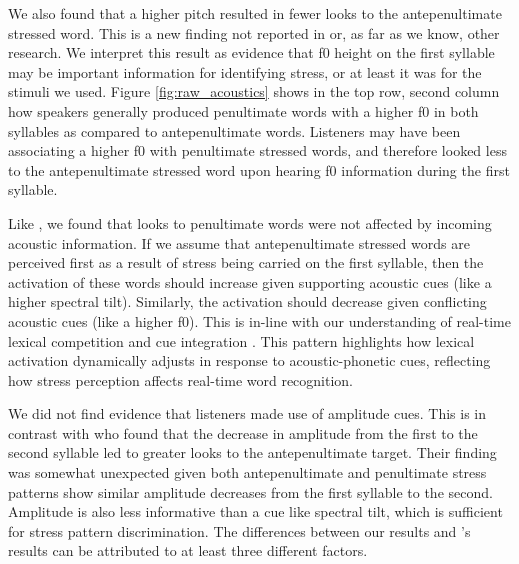 We also found that a higher pitch resulted in fewer looks to the antepenultimate stressed word. This is a new finding not reported in \cite{Sulpizio_McQueen_2012} or, as far as we know, other research. We interpret this result as evidence that f0 height on the first syllable may be important information for identifying stress, or at least it was for the stimuli we used. Figure \ref{fig:raw_acoustics} shows in the top row, second column how speakers generally produced penultimate words with a higher f0 in both syllables as compared to antepenultimate words. Listeners may have been associating a higher f0 with penultimate stressed words, and therefore looked less to the antepenultimate stressed word upon hearing f0 information during the first syllable.

Like \cite{Sulpizio_McQueen_2012}, we found that looks to penultimate words were not affected by incoming acoustic information. If we assume that antepenultimate stressed words are perceived first as a result of stress being carried on the first syllable, then the activation of these words should increase given supporting acoustic cues (like a higher spectral tilt). Similarly, the activation should decrease given conflicting acoustic cues (like a higher f0). This is in-line with our understanding of real-time lexical competition and cue integration \citep{Marslen1980, Kong2016, mcmurray_2008}. This pattern highlights how lexical activation dynamically adjusts in response to acoustic-phonetic cues, reflecting how stress perception affects real-time word recognition.

We did not find evidence that listeners made use of amplitude cues. This is in contrast with \cite{Sulpizio_McQueen_2012} who found that the decrease in amplitude from the first to the second syllable led to greater looks to the antepenultimate target. Their finding was somewhat unexpected given both antepenultimate and penultimate stress patterns show similar amplitude decreases from the first syllable to the second. Amplitude is also less informative than a cue like spectral tilt, which is sufficient for stress pattern discrimination. The differences between our results and \cite{Sulpizio_McQueen_2012}'s results can be attributed to at least three different factors. 

